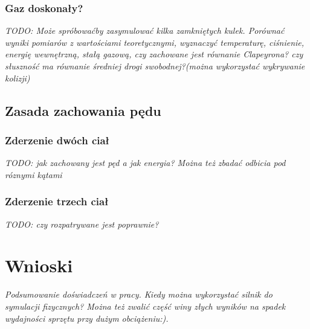 \subsubsection{Gaz doskonały?}
\emph{TODO: Może spróbowaćby zasymulować kilka zamkniętych kulek. Porównać
wyniki pomiarów z wartościami teoretycznymi, wyznaczyć temperaturę, ciśnienie,
energię wewnętrzną, stałą gazową, czy zachowane jest równanie Clapeyrona? czy
słuszność ma równanie średniej drogi swobodnej?(można wykorzystać wykrywanie
kolizji)}

\subsection{Zasada zachowania pędu}

\subsubsection{Zderzenie dwóch ciał}
\emph{TODO: jak zachowany jest pęd a jak energia? Można też zbadać odbicia pod
róznymi kątami}

\subsubsection{Zderzenie trzech ciał}
\emph{TODO: czy rozpatrywane jest poprawnie?}


\newpage
\section{Wnioski}
\emph{Podsumowanie doświadczeń w pracy. Kiedy można wykorzystać silnik do
symulacji fizycznych? Można też zwalić część winy złych wyników na spadek
wydajności sprzętu przy dużym obciążeniu:).}
